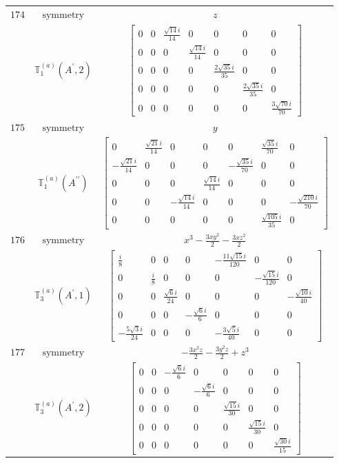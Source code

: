 \documentclass[fleqn,8pt,landscape]{jsarticle}
\begin{document}
\begin{longtable}{ccc}
$ 174 $ & $ \text{symmetry} $ & $ z $ \\
$  $ & $ \mathbb{T}_{1}^{(a)}(A^{\prime},2) $ & $ \begin{bmatrix} 0 & 0 & \frac{\sqrt{14} i}{14} & 0 & 0 & 0 & 0 \\ 0 & 0 & 0 & \frac{\sqrt{14} i}{14} & 0 & 0 & 0 \\ 0 & 0 & 0 & 0 & \frac{2 \sqrt{35} i}{35} & 0 & 0 \\ 0 & 0 & 0 & 0 & 0 & \frac{2 \sqrt{35} i}{35} & 0 \\ 0 & 0 & 0 & 0 & 0 & 0 & \frac{3 \sqrt{70} i}{70} \end{bmatrix} $ \\ \hline
$ 175 $ & $ \text{symmetry} $ & $ y $ \\
$  $ & $ \mathbb{T}_{1}^{(a)}(A^{\prime\prime}) $ & $ \begin{bmatrix} 0 & \frac{\sqrt{21} i}{14} & 0 & 0 & 0 & \frac{\sqrt{35} i}{70} & 0 \\ - \frac{\sqrt{21} i}{14} & 0 & 0 & 0 & - \frac{\sqrt{35} i}{70} & 0 & 0 \\ 0 & 0 & 0 & \frac{\sqrt{14} i}{14} & 0 & 0 & 0 \\ 0 & 0 & - \frac{\sqrt{14} i}{14} & 0 & 0 & 0 & - \frac{\sqrt{210} i}{70} \\ 0 & 0 & 0 & 0 & 0 & \frac{\sqrt{105} i}{35} & 0 \end{bmatrix} $ \\ \hline
$ 176 $ & $ \text{symmetry} $ & $ x^{3} - \frac{3 x y^{2}}{2} - \frac{3 x z^{2}}{2} $ \\
$  $ & $ \mathbb{T}_{3}^{(a)}(A^{\prime},1) $ & $ \begin{bmatrix} \frac{i}{8} & 0 & 0 & 0 & - \frac{11 \sqrt{15} i}{120} & 0 & 0 \\ 0 & \frac{i}{8} & 0 & 0 & 0 & - \frac{\sqrt{15} i}{120} & 0 \\ 0 & 0 & \frac{\sqrt{6} i}{24} & 0 & 0 & 0 & - \frac{\sqrt{10} i}{40} \\ 0 & 0 & 0 & - \frac{\sqrt{6} i}{6} & 0 & 0 & 0 \\ - \frac{5 \sqrt{3} i}{24} & 0 & 0 & 0 & - \frac{3 \sqrt{5} i}{40} & 0 & 0 \end{bmatrix} $ \\ \hline
$ 177 $ & $ \text{symmetry} $ & $ - \frac{3 x^{2} z}{2} - \frac{3 y^{2} z}{2} + z^{3} $ \\
$  $ & $ \mathbb{T}_{3}^{(a)}(A^{\prime},2) $ & $ \begin{bmatrix} 0 & 0 & - \frac{\sqrt{6} i}{6} & 0 & 0 & 0 & 0 \\ 0 & 0 & 0 & - \frac{\sqrt{6} i}{6} & 0 & 0 & 0 \\ 0 & 0 & 0 & 0 & \frac{\sqrt{15} i}{30} & 0 & 0 \\ 0 & 0 & 0 & 0 & 0 & \frac{\sqrt{15} i}{30} & 0 \\ 0 & 0 & 0 & 0 & 0 & 0 & \frac{\sqrt{30} i}{15} \end{bmatrix} $ \\ \hline

\end{longtable}
\end{document}
